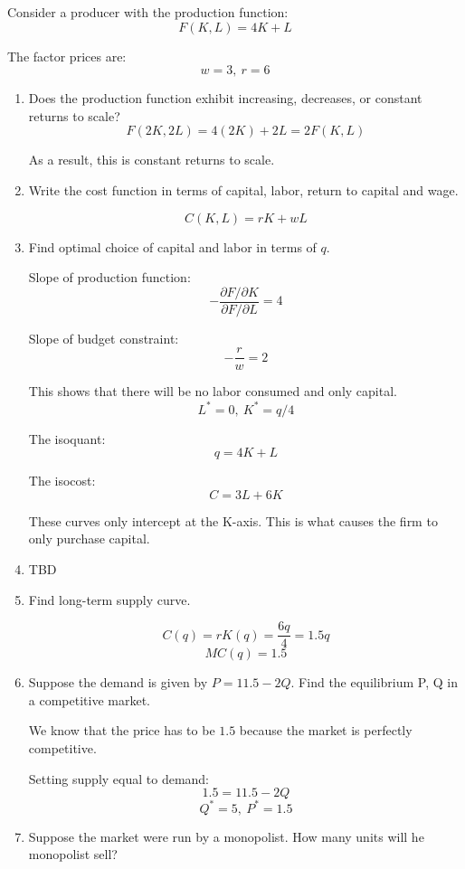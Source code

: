 \documentclass{article}
\begin{document}
Consider a producer with the production function:
$$ F( K,L ) = 4K + L$$

The factor prices are:
$$ w = 3,\ r = 6 $$

\begin{enumerate}[1.]
    \item Does the production function exhibit increasing, decreases, or
        constant returns to scale?
        $$ F( 2K, 2L ) = 4( 2K ) + 2L = 2 F( K, L ) $$

        As a result, this is constant returns to scale.

    \item Write the cost function in terms of capital, labor, return to capital
        and wage.

        $$ C( K, L ) = rK + wL$$

    \item Find optimal choice of capital and labor in terms of $q$. 

        Slope of production function:
        $$ -\frac{ \partial F / \partial K }{ \partial F / \partial L } = 4 $$

        Slope of budget constraint:
        $$ -\frac{ r }{ w } = 2 $$

        This shows that there will be no labor consumed and only capital.
        $$ L^{*} = 0,\ K^{*} = q/4 $$

        The isoquant:
        $$ q = 4K + L $$

        The isocost:
        $$ C = 3L + 6K $$

        These curves only intercept at the K-axis. This is what causes the firm
        to only purchase capital.

    \item TBD

    \item Find long-term supply curve.

        $$ C( q ) = r K( q ) = \frac{ 6 q }{ 4 } = 1.5 q $$
        $$ MC( q ) = 1.5 $$

    \item Suppose the demand is given by $P = 11.5 - 2Q$. Find the equilibrium
        P, Q in a competitive market. 

        We know that the price has to be $1.5$ because the market is perfectly
        competitive. 

        Setting supply equal to demand:
        $$ 1.5 = 11.5 - 2Q $$
        $$ Q^{*} = 5,\ P^{*} = 1.5 $$

    \item Suppose the market were run by a monopolist. How many units will he
        monopolist sell?


\end{enumerate}
\end{document}

